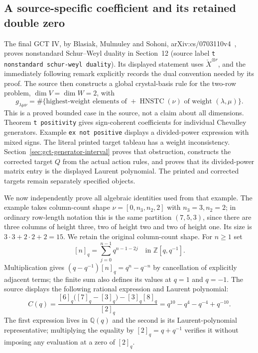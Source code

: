 \subsection{A source-specific coefficient and its retained double zero}

The final GCT IV, by Blasiak, Mulmuley and Sohoni,
arXiv:cs/0703110v4~\cite{blasiakmulmuleysohoni2013gct4}, proves nonstandard Schur--Weyl duality in Section~12
(source label \texttt{t nonstandard schur-weyl duality}).  Its displayed
statement uses $\check X^{\otimes r}$, and the immediately following
remark explicitly records the dual convention needed by its proof.
The source then constructs a global crystal-basis rule for the
two-row problem, $\dim V=\dim W=2$, with
\[
 g_{\lambda\mu\nu}
  =\#\{\text{highest-weight elements of }{+}\operatorname{HNSTC}(\nu)
          \text{ of weight }(\lambda,\mu)\}.
\]
This is a proved bounded case in the source, not a claim about all
dimensions.  Theorem \texttt{t positivity} gives sign-coherent
coefficients for individual Chevalley generators.  Example
\texttt{ex not positive} displays a divided-power expression with mixed
signs. The literal printed target tableau has a weight inconsistency.
Section~\ref{sec:gct-generator-interval} proves that obstruction, constructs
the corrected target $Q$ from the actual action rules, and proves that
its divided-power matrix entry is the displayed Laurent polynomial.
The printed and corrected targets remain separately specified objects.

We now independently prove all algebraic identities used from that
example.  The example takes column-count shape
$\nu=[0,n_3,n_2,2]$ with $n_3=3,n_2=2$; in ordinary row-length notation
this is the same partition $(7,5,3)$, since there are three columns of
height three, two of height two and two of height one.  Its size is
$3\cdot3+2\cdot2+2=15$.  We retain the original column-count shape.
For $n\ge1$ set
\[
 [n]_q=\sum_{j=0}^{n-1}q^{n-1-2j}
 \quad\text{in }\mathbb Z[q,q^{-1}].
\]
Multiplication gives
$(q-q^{-1})[n]_q=q^n-q^{-n}$ by cancellation of explicitly adjacent
terms; the finite sum also defines its values at $q=1$ and $q=-1$.
The source displays the following rational expression and Laurent polynomial:
\begin{equation}\label{eq:gct-nrh-coefficient-original}
 C(q)=\frac{[6]_q\bigl([7]_q-[3]_q\bigr)-[3]_q[8]_q}{[2]_q}
      =q^{10}-q^4-q^{-4}+q^{-10}.
\end{equation}
The first expression lives in $\mathbb Q(q)$ and the second is its
Laurent-polynomial representative; multiplying the equality by
$[2]_q=q+q^{-1}$ verifies it without imposing any evaluation at a zero
of $[2]_q$.

